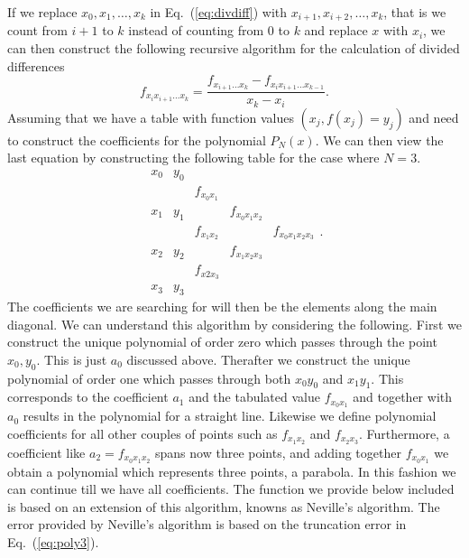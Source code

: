 If we replace $x_0,x_1,\dots,x_k$ in Eq.\ (\ref{eq:divdiff}) with 
$x_{i+1},x_{i+2},\dots,x_k$, that is we count from $i+1$ to $k$ instead of counting 
from $0$ to $k$ and replace $x$ with $x_i$, we can then construct the following recursive
algorithm for the calculation of divided differences
\[
   f_{x_ix_{i+1}\dots x_k}=\frac{f_{x_{i+1}\dots x_k}-f_{x_ix_{i+1}\dots x_{k-1}}}{x_k-x_i}.
\]
Assuming that we have a table with function values $(x_j, f(x_j)=y_j)$ and need to construct
the coefficients for the polynomial $P_N(x)$. We can then view the last equation
by constructing the following table for the case where $N=3$.
\[
      \begin{array}{cccccc} x_0&y_0  &          &  & \\
                              &      &f_{x_0x_1}  &  &  \\
                            x_1&y_1  &          & f_{x_0x_1x_2} &  \\
                              &      &f_{x_1x_2}  &  &f_{x_0x_1x_2x_3}  \\
                            x_2&y_2  &  & f_{x_1x_2x_3} &  \\
                              &      &f_{x2x_3}  &  &  \\
                            x_3&y_3  &  & \end{array}.
\]
The coefficients we are searching for will then be the elements along the main diagonal.
We can understand this algorithm by considering the following. First we construct 
the unique polynomial of order zero which passes through the point $x_0,y_0$. This is just
$a_0$ discussed above. Therafter we construct the unique polynomial of order one
which passes through both $x_0y_0$ and $x_1y_1$. This corresponds to the coefficient 
$a_1$ and the tabulated value $f_{x_0x_1}$ and together with $a_0$ results in the polynomial
for a 
straight line. Likewise we define polynomial coefficients for all other couples of points
such as    $f_{x_1x_2}$ and $f_{x_2x_3}$. Furthermore, a coefficient like $a_2=f_{x_0x_1x_2}$
spans now three points, and adding together $f_{x_0x_1}$ we obtain a polynomial
which represents three points, a parabola. In this fashion we can continue
till we have all coefficients. The function we provide below included is based
on an extension of this algorithm, knowns as Neville's algorithm. 
The error provided by Neville's algorithm 
is based on the truncation error in Eq.~(\ref{eq:poly3}).
